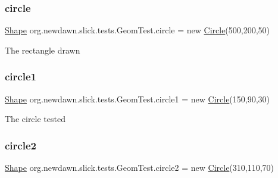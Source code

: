 \subsubsection{\texorpdfstring{circle}{circle}}
{\footnotesize\ttfamily \mbox{\hyperlink{classorg_1_1newdawn_1_1slick_1_1geom_1_1_shape}{Shape}} org.\+newdawn.\+slick.\+tests.\+Geom\+Test.\+circle = new \mbox{\hyperlink{classorg_1_1newdawn_1_1slick_1_1geom_1_1_circle}{Circle}}(500,200,50)\hspace{0.3cm}{\ttfamily [private]}}

The rectangle drawn \mbox{\label{classorg_1_1newdawn_1_1slick_1_1tests_1_1_geom_test_a6c2628635624ad1566aab135fa63fdcc}} 
\subsubsection{\texorpdfstring{circle1}{circle1}}
{\footnotesize\ttfamily \mbox{\hyperlink{classorg_1_1newdawn_1_1slick_1_1geom_1_1_shape}{Shape}} org.\+newdawn.\+slick.\+tests.\+Geom\+Test.\+circle1 = new \mbox{\hyperlink{classorg_1_1newdawn_1_1slick_1_1geom_1_1_circle}{Circle}}(150,90,30)\hspace{0.3cm}{\ttfamily [private]}}

The circle tested \mbox{\label{classorg_1_1newdawn_1_1slick_1_1tests_1_1_geom_test_a85946baee82f4456ee261472685cbab3}} 
\subsubsection{\texorpdfstring{circle2}{circle2}}
{\footnotesize\ttfamily \mbox{\hyperlink{classorg_1_1newdawn_1_1slick_1_1geom_1_1_shape}{Shape}} org.\+newdawn.\+slick.\+tests.\+Geom\+Test.\+circle2 = new \mbox{\hyperlink{classorg_1_1newdawn_1_1slick_1_1geom_1_1_circle}{Circle}}(310,110,70)\hspace{0.3cm}{\ttfamily [private]}}

